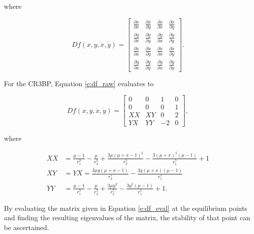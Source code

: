 \documentclass[11pt]{article} %
\begin{document}
\noindent
where

\doublespacing
\begin{equation}
	\label{e:df_raw}
	Df\left(x,y,\dot{x},\dot{y}\right) = 
	\begin{bmatrix} 
		\frac{\partial \dot{x}}{\partial x} & \frac{\partial \dot{x}}{\partial y} & \frac{\partial \dot{x}}{\partial \dot{x}}  & \frac{\partial \dot{x}}{\partial \dot{y}} \\ 
		\frac{\partial \dot{y}}{\partial x} & \frac{\partial \dot{y}}{\partial y} & \frac{\partial \dot{y}}{\partial \dot{x}} & \frac{\partial \dot{y}}{\partial \dot{y}} \\
		\frac{\partial \ddot{x}}{\partial x} & \frac{\partial \ddot{x}}{\partial y} & \frac{\partial \ddot{x}}{\partial \dot{x}} & \frac{\partial \ddot{x}}{\partial \dot{y}} \\
		\frac{\partial \ddot{y}}{\partial x} & \frac{\partial \ddot{y}}{\partial y} & \frac{\partial \ddot{y}}{\partial \dot{x}} & \frac{\partial \ddot{y}}{\partial \dot{y}}
	\end{bmatrix}.
\end{equation}
\singlespacing

\noindent 
For the CR3BP, Equation \ref{e:df_raw} evaluates to 

\doublespacing
\begin{equation}
	\label{e:df_eval}
	Df\left(x,y,\dot{x},\dot{y}\right) = 
	\begin{bmatrix} 
		0 & 0 & 1  & 0 \\ 
		0 & 0 & 0 & 1 \\
		XX & XY & 0 & 2 \\
		YX & YY & -2 & 0
	\end{bmatrix},
\end{equation}
\singlespacing

\noindent
where

\begin{align}
	XX &= \frac{\mu - 1}{r_1^3} - \frac{\mu}{r_2^3} + \frac{3\mu\left(\mu+x-1\right)^2}{r_2^5} - \frac{3\left(\mu+x\right)^2\left(\mu-1\right)}{r_1^5} + 1 \\
	XY &= YX = \frac{3\mu y\left(\mu+x-1\right)}{r_2^5} - \frac{3y\left(\mu+x\right)\left(\mu-1\right)}{r_1^5} \\
	YY &= \frac{\mu - 1}{r_1^3} - \frac{\mu}{r_2^3} + \frac{3\mu y^2}{r_2^5} - \frac{3y^2\left(\mu-1\right)}{r_1^5} + 1.
\end{align}

\noindent
By evaluating the matrix given in Equation \ref{e:df_eval} at the equilibrium points and finding the resulting eigenvalues of the matrix, the stability of that point can be ascertained.
\end{document}
